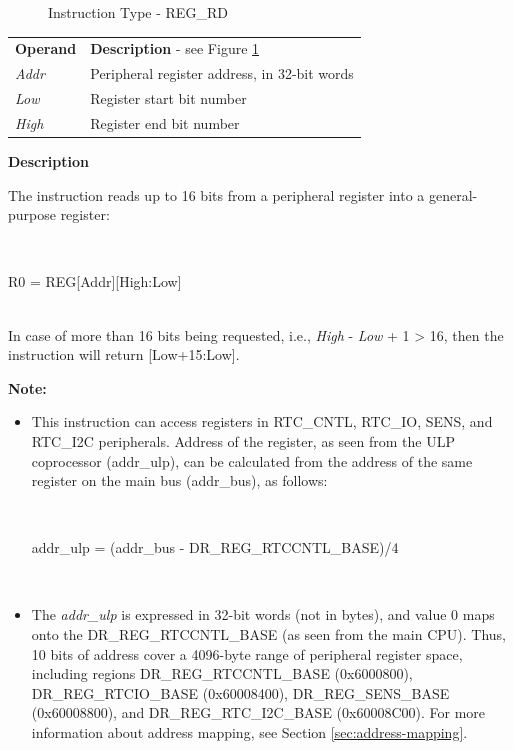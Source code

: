 \documentclass[main\_\_EN.tex]{subfiles}
\begin{document}
%
%
%
%
%
\begin{figure}[!ht ]
    \centering
    \caption{Instruction Type - REG\_RD}
    \label{figure:REG_RD}
\end{figure}

\vspace{-2em}
\begin{tabular}{ l l }
\textbf{Operand} & \textbf{Description} - see Figure \ref{figure:REG_RD} \\
\textit{Addr} & Peripheral register address, in 32-bit words \\
\textit{Low} & Register start bit number \\
\textit{High} & Register end bit number \\
\end{tabular}

\textbf{Description}

The instruction reads up to 16 bits from a peripheral register into a general-purpose register:

~
\begin{centering}
    R0 = REG[Addr][High:Low] \\
\end{centering}
~\\

\vspace{-2em}
In case of more than 16 bits being requested, i.e., \textit{High} - \textit{Low} + 1 > 16, then the instruction will return [Low+15:Low].

\textbf{Note:}
\begin{itemize}
    \item This instruction can access registers in RTC\_CNTL, RTC\_IO, SENS, and RTC\_I2C peripherals. Address of the register, as seen from the ULP coprocessor (addr\_ulp), can be calculated from the address of the same register on the main bus (addr\_bus), as follows:

    ~
    \begin{centering}
        addr\_ulp = (addr\_bus - DR\_REG\_RTCCNTL\_BASE)/4 \\
    \end{centering}
    ~
   \vspace{-2em}
    \item The \textit{addr\_ulp} is expressed in 32-bit words (not in bytes), and value 0 maps onto the DR\_REG\_RTCCNTL\_BASE (as seen from the main CPU). Thus, 10 bits of address cover a 4096-byte range of peripheral register space, including regions DR\_REG\_RTCCNTL\_BASE (0x{}6000800), DR\_REG\_RTCIO\_BASE (0x{}60008400), DR\_REG\_SENS\_BASE (0x{}60008800), and DR\_REG\_RTC\_I2C\_BASE (0x{}60008C00). For more information about address mapping, see Section \ref{sec:address-mapping}.
\end{itemize}
\end{document}
